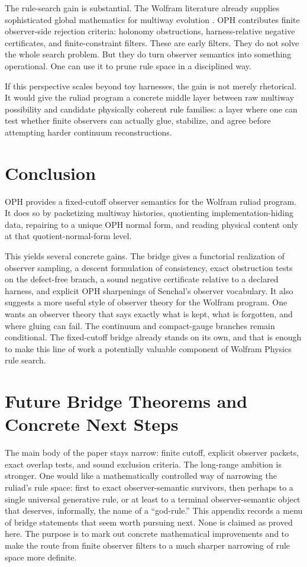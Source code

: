 \documentclass[11pt]{article}
\theoremstyle{remark}
\theoremstyle{plain}
\begin{document}
The rule-search gain is substantial. The Wolfram literature already supplies sophisticated global mathematics for multiway evolution \cite{rickles2023,gorard2023functorial}. OPH contributes finite observer-side rejection criteria: holonomy obstructions, harness-relative negative certificates, and finite-constraint filters. These are early filters. They do not solve the whole search problem. But they do turn observer semantics into something operational. One can use it to prune rule space in a disciplined way.

If this perspective scales beyond toy harnesses, the gain is not merely rhetorical. It would give the ruliad program a concrete middle layer between raw multiway possibility and candidate physically coherent rule families: a layer where one can test whether finite observers can actually glue, stabilize, and agree before attempting harder continuum reconstructions.

\section{Conclusion}

OPH provides a fixed-cutoff observer semantics for the Wolfram ruliad program. It does so by packetizing multiway histories, quotienting implementation-hiding data, repairing to a unique OPH normal form, and reading physical content only at that quotient-normal-form level.

This yields several concrete gains. The bridge gives a functorial realization of observer sampling, a descent formulation of consistency, exact obstruction tests on the defect-free branch, a sound negative certificate relative to a declared harness, and explicit OPH sharpenings of Senchal's observer vocabulary. It also suggests a more useful style of observer theory for the Wolfram program. One wants an observer theory that says exactly what is kept, what is forgotten, and where gluing can fail. The continuum and compact-gauge branches remain conditional. The fixed-cutoff bridge already stands on its own, and that is enough to make this line of work a potentially valuable component of Wolfram Physics rule search.

\appendix

\section{Future Bridge Theorems and Concrete Next Steps}
\label{app:future}

The main body of the paper stays narrow: finite cutoff, explicit observer packets, exact overlap tests, and sound exclusion criteria. The long-range ambition is stronger. One would like a mathematically controlled way of narrowing the ruliad's rule space: first to exact observer-semantic survivors, then perhaps to a single universal generative rule, or at least to a terminal observer-semantic object that deserves, informally, the name of a ``god-rule.'' This appendix records a menu of bridge statements that seem worth pursuing next. None is claimed as proved here. The purpose is to mark out concrete mathematical improvements and to make the route from finite observer filters to a much sharper narrowing of rule space more definite.
\end{document}
